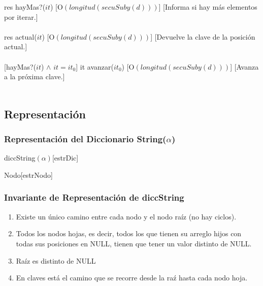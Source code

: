   {res \igobs hayMas?($it$)}%
  [O$(longitud(secuSuby(d)))$] %
  [Informa si hay m\'as elementos por iterar.]\\\\

  {res \igobs actual($it$)}
  [O$(longitud(secuSuby(d)))$]%
  [Devuelve la clave de la posici\'on actual.]\\\\

  [hayMas?($it$) $\land$ $it = it_{0}$] %
  {it \igobs avanzar($it_{0}$)}
  [O$(longitud(secuSuby(d)))$]%
  [Avanza a la pr\'oxima clave.]\\\\


\subsection{Representaci\'on}
  
  \subsubsection{Representaci\'on del Diccionario String($\alpha$)}
  \begin{Estructura}{diccString$(\alpha)$}[estrDic]
    \begin{Tupla}[estrDic]
    \end{Tupla}
\end{Estructura}

  \begin{Estructura}{Nodo}[estrNodo]
    \begin{Tupla}[estrNodo]
    \end{Tupla}
\end{Estructura}

 \subsubsection{Invariante de Representaci\'on de diccString}
\renewcommand{\labelenumi}{(\Roman{enumi})}
 \begin{enumerate}
 	\item Existe un \'unico camino entre cada nodo y el nodo ra\'iz (no hay ciclos).
 	\item Todos los nodos hojas, es decir, todos los que tienen su arreglo hijos con todas sus posiciones en NULL, tienen que tener un valor distinto de NULL.
 	\item Ra\'iz es distinto de NULL
 	\item En claves est\'a el camino que se recorre desde la ra\'z hasta cada nodo hoja.
  \end{enumerate}

